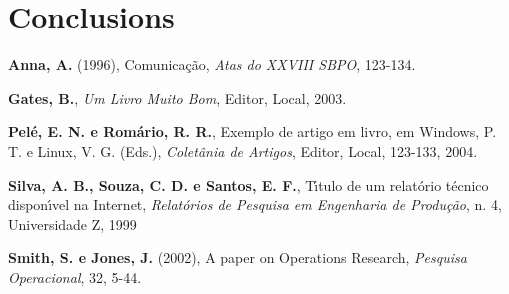 \documentclass[a4paper,11pt]{article}
\begin{document}
\section{Conclusions}

\bigskip
{}

\noindent \textbf {Anna, A.} (1996), Comunica\c c\~ao, \textit{Atas do XXVIII SBPO}, 123-134.

\noindent \textbf{Gates, B.}, \textit{Um Livro Muito Bom}, Editor, Local, 2003.

\noindent  \textbf{Pel\'e, E. N. e Rom\'ario, R. R.}, Exemplo de artigo em livro, em Windows, P. T. e Linux, V. G. (Eds.),
\textit{Colet\^ania de Artigos},  Editor, Local, 123-133, 2004.

\noindent  \textbf{Silva, A. B., Souza, C. D. e Santos, E. F.}, T\'\i tulo de um relat\'orio t\'ecnico dispon\'\i vel na Internet,
\textit{ Relat\'orios de Pesquisa em Engenharia de Produ\c c\~ao}, n. 4,  Universidade Z,
1999


\noindent  \textbf{Smith, S. e Jones, J.} (2002), A paper on Operations Research, \textit{Pesquisa Operacional},
32, 5-44.
\end{document}
